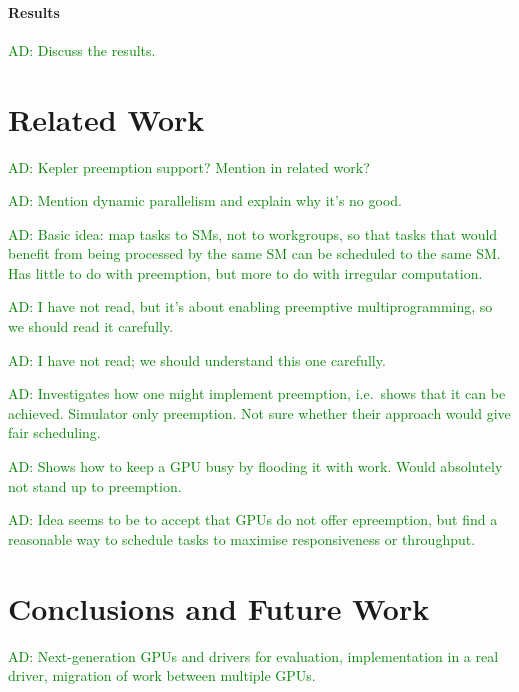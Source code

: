 \documentclass[numbers,nocopyrightspace,10pt]{sigplanconf}
\newcommand{\ADComment}[1]{\textcolor{green}{AD: #1}}
\begin{document}
\paragraph{Results}  \ADComment{Discuss the results.}



\section{Related Work}\label{sec:relatedwork}

\ADComment{Kepler preemption support?  Mention in related work?}

\ADComment{Mention dynamic parallelism and explain why it's no good.}

\cite{DBLP:conf/ics/WuCLSV15} \ADComment{Basic idea: map tasks to
  SMs, not to workgroups, so that tasks that would benefit from being
  processed by the same SM can be scheduled to the same SM.  Has
  little to do with preemption, but more to do with irregular
  computation.}

\cite{DBLP:conf/isca/TanasicGCRNV14} \ADComment{I have not read, but
  it's about enabling preemptive multiprogramming, so we should read
  it carefully.}

\cite{DBLP:conf/ppopp/Muyan-OzcelikO16} \ADComment{I have not read; we
  should understand this one carefully.}

\cite{DBLP:conf/asplos/ParkPM15} \ADComment{Investigates how one might
  implement preemption, i.e.\ shows that it can be achieved.
  Simulator only preemption.  Not sure whether their approach would
  give fair scheduling.}

\cite{DBLP:journals/tog/SteinbergerKBKDS14} \ADComment{Shows how to
  keep a GPU busy by flooding it with work.  Would absolutely not
  stand up to preemption.}

\cite{DBLP:conf/usenix/KatoLRI11} \ADComment{Idea seems to be to
  accept that GPUs do not offer epreemption, but find a reasonable way
  to schedule tasks to maximise responsiveness or throughput.}


\section{Conclusions and Future Work}\label{sec:conclusion}

\ADComment{Next-generation GPUs and drivers for evaluation,
  implementation in a real driver, migration of work between multiple
  GPUs.}

\clearpage
\end{document}
